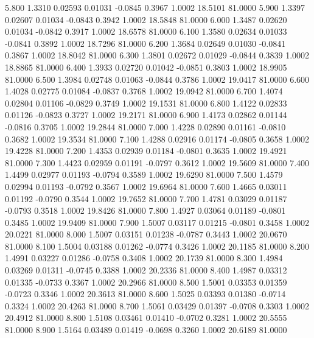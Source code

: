    5.800   1.3310   0.02593   0.01031  -0.0845   0.3967   1.0002  18.5101  81.0000
   5.900   1.3397   0.02607   0.01034  -0.0843   0.3942   1.0002  18.5848  81.0000
   6.000   1.3487   0.02620   0.01034  -0.0842   0.3917   1.0002  18.6578  81.0000
   6.100   1.3580   0.02634   0.01033  -0.0841   0.3892   1.0002  18.7296  81.0000
   6.200   1.3684   0.02649   0.01030  -0.0841   0.3867   1.0002  18.8042  81.0000
   6.300   1.3801   0.02672   0.01029  -0.0844   0.3839   1.0002  18.8865  81.0000
   6.400   1.3933   0.02720   0.01042  -0.0851   0.3803   1.0002  18.9905  81.0000
   6.500   1.3984   0.02748   0.01063  -0.0844   0.3786   1.0002  19.0417  81.0000
   6.600   1.4028   0.02775   0.01084  -0.0837   0.3768   1.0002  19.0942  81.0000
   6.700   1.4074   0.02804   0.01106  -0.0829   0.3749   1.0002  19.1531  81.0000
   6.800   1.4122   0.02833   0.01126  -0.0823   0.3727   1.0002  19.2171  81.0000
   6.900   1.4173   0.02862   0.01144  -0.0816   0.3705   1.0002  19.2844  81.0000
   7.000   1.4228   0.02890   0.01161  -0.0810   0.3682   1.0002  19.3534  81.0000
   7.100   1.4288   0.02916   0.01174  -0.0805   0.3658   1.0002  19.4228  81.0000
   7.200   1.4353   0.02939   0.01184  -0.0801   0.3635   1.0002  19.4921  81.0000
   7.300   1.4423   0.02959   0.01191  -0.0797   0.3612   1.0002  19.5609  81.0000
   7.400   1.4499   0.02977   0.01193  -0.0794   0.3589   1.0002  19.6290  81.0000
   7.500   1.4579   0.02994   0.01193  -0.0792   0.3567   1.0002  19.6964  81.0000
   7.600   1.4665   0.03011   0.01192  -0.0790   0.3544   1.0002  19.7652  81.0000
   7.700   1.4781   0.03029   0.01187  -0.0793   0.3518   1.0002  19.8426  81.0000
   7.800   1.4927   0.03064   0.01189  -0.0801   0.3485   1.0002  19.9409  81.0000
   7.900   1.5007   0.03117   0.01215  -0.0801   0.3458   1.0002  20.0221  81.0000
   8.000   1.5007   0.03151   0.01238  -0.0787   0.3443   1.0002  20.0670  81.0000
   8.100   1.5004   0.03188   0.01262  -0.0774   0.3426   1.0002  20.1185  81.0000
   8.200   1.4991   0.03227   0.01286  -0.0758   0.3408   1.0002  20.1739  81.0000
   8.300   1.4984   0.03269   0.01311  -0.0745   0.3388   1.0002  20.2336  81.0000
   8.400   1.4987   0.03312   0.01335  -0.0733   0.3367   1.0002  20.2966  81.0000
   8.500   1.5001   0.03353   0.01359  -0.0723   0.3346   1.0002  20.3613  81.0000
   8.600   1.5025   0.03393   0.01380  -0.0714   0.3324   1.0002  20.4263  81.0000
   8.700   1.5061   0.03429   0.01397  -0.0708   0.3303   1.0002  20.4912  81.0000
   8.800   1.5108   0.03461   0.01410  -0.0702   0.3281   1.0002  20.5555  81.0000
   8.900   1.5164   0.03489   0.01419  -0.0698   0.3260   1.0002  20.6189  81.0000
